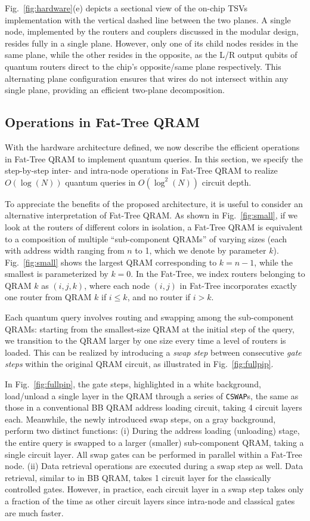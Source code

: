 Fig.~\ref{fig:hardware}(e) depicts a sectional view of the on-chip TSVs implementation with the vertical dashed line between the two planes. A single node, implemented by the routers and couplers discussed in the modular design, resides fully in a single plane. However, only one of its child nodes resides in the same plane, while the other resides in the opposite, as the L/R output qubits of quantum routers direct to the chip's opposite/same plane respectively. This alternating plane configuration ensures that wires do not intersect within any single plane, providing an efficient two-plane decomposition.


\subsection{Operations in Fat-Tree QRAM}
\label{subsec:operation}
With the hardware architecture defined, we now describe the efficient operations in Fat-Tree QRAM to implement quantum queries. In this section, we specify the step-by-step inter- and intra-node operations in Fat-Tree QRAM to realize $O(\log(N))$ quantum queries in $O(\log^2(N))$ circuit depth. 

To appreciate the benefits of the proposed architecture, it is useful to consider an alternative interpretation of Fat-Tree QRAM. As shown in Fig.~\ref{fig:small}, if we look at the routers of different colors in isolation, a Fat-Tree QRAM is equivalent to a composition of multiple ``sub-component QRAMs'' of varying sizes (each with address width ranging from $n$ to 1, which we denote by parameter $k$). Fig.~\ref{fig:small} shows the largest QRAM corresponding to $k=n-1$, while the smallest is parameterized by $k=0$. In the Fat-Tree, we index routers belonging to QRAM $k$ as $(i,j,k)$, where each node $(i,j)$ in Fat-Tree incorporates exactly one router from QRAM $k$ if $i \leq k$, and no router if $i > k$. 

Each quantum query involves routing and swapping among the sub-component QRAMs: starting from the smallest-size QRAM at the initial step of the query, we transition to the QRAM larger by one size every time a level of routers is loaded. This can be realized by introducing a \emph{swap step} between consecutive \emph{gate steps} within the original QRAM circuit, as illustrated in Fig.~\ref{fig:fullpip}. 

In Fig.~\ref{fig:fullpip}, the gate steps, highlighted in a white background, load/unload a single layer in the QRAM through a series of \texttt{CSWAP}s, the same as those in a conventional BB QRAM address loading circuit, taking 4 circuit layers each. Meanwhile, the newly introduced swap steps, on a gray background, perform two distinct functions: (i) During the address loading (unloading) stage, the entire query is swapped to a larger (smaller) sub-component QRAM, taking a single circuit layer. All swap gates can be performed in parallel within a Fat-Tree node. (ii) Data retrieval operations are executed during a swap step as well. Data retrieval, similar to in BB QRAM, takes 1 circuit layer for the classically controlled gates. However, in practice, each circuit layer in a swap step takes only a fraction of the time as other circuit layers since intra-node and classical gates are much faster.

